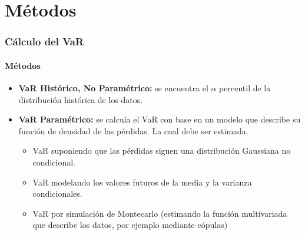 \documentclass[aspectratio=169]{beamer}
\begin{document}
\section{Métodos}
\begin{frame}
\frametitle{Cálculo del VaR}
\framesubtitle{Métodos}



\begin{itemize}
\item \textbf{VaR Histórico, No Paramétrico:} se encuentra el $\alpha$ percentil de la distribución histórica de los datos.

\vspace{4mm}

\item \textbf{VaR Paramétrico:} se calcula el VaR con base en un modelo que describe su función de densidad de las pérdidas. La cual debe ser estimada.

\begin{itemize}
\item VaR suponiendo que las pérdidas siguen una distribución Gaussiana no condicional.

\item VaR modelando los valores futuros de la media y la varianza condicionales.

\item VaR por simulación de Montecarlo (estimando la función multivariada que describe los datos, por ejemplo mediante cópulas)
\end{itemize} 


\end{itemize}



\end{frame}



\end{document}
